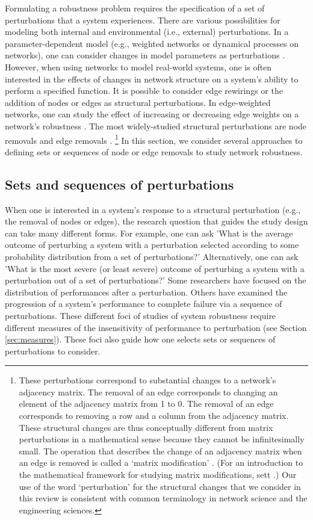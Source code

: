 \documentclass{comnet-mod}
\begin{document}
Formulating a robustness problem requires the specification of a set of perturbations that a system experiences. There are various possibilities for modeling both internal and environmental (i.e., external) perturbations. In a parameter-dependent model (e.g., weighted networks or dynamical processes on networks), one can consider changes in model parameters as perturbations \cite{Stelling2004, Walsh2013}. However, when using networks to model real-world systems, one is often interested in the effects of changes in network structure on a system's ability to perform a specified function. It is possible to consider edge rewirings \cite{Karrer2008} or the addition of nodes or edges \cite{Witthaut2012, Wang2014b} as structural perturbations. In edge-weighted networks, one can study the effect of increasing or decreasing edge weights on a network's robustness \cite{Zhang2013b}. The most widely-studied structural perturbations are node removals and edge removals \cite{Cohen2010, Gao2015}. \footnote{These perturbations correspond to substantial changes to a network's adjacency matrix. The removal of an edge corresponds to changing an element of the adjacency matrix from 1 to 0. The removal of an edge corresponds to removing a row and a column from the adjacency matrix. These structural changes are thus conceptually different from matrix perturbations in a mathematical sense because they cannot be infinitesimally small. The operation that describes the change of an adjacency matrix when an edge is removed is called a `matrix modification' \cite{Higham2003, Liu2003}. (For an introduction to the mathematical framework for studying matrix modifications, sett \cite{Higham2003}.) Our use of the word `perturbation' for the structural changes that we consider in this review is consistent with common terminology in network science and the engineering sciences.} In this section, we consider several approaches to defining sets or sequences of node or edge removals to study network robustness.


\subsection{Sets and sequences of perturbations}\label{sec:sets_and_sequences}

When one is interested in a system's response to a structural perturbation (e.g., the removal of nodes or edges), the research question that guides the study design can take many different forms. For example, one can ask 'What is the average outcome of perturbing a system with a perturbation selected according to some probability distribution from a set of perturbations?' 
Alternatively, one can ask 'What is the most severe (or least severe) outcome of perturbing a system with a perturbation out of a set of perturbations?' Some researchers have focused on the distribution of performances after a perturbation. Others have examined the progression of a system's performance to complete failure via a sequence of perturbations. These different foci of studies of system robustness require different measures of the insensitivity of performance to perturbation (see Section \ref{sec:measures}). These foci also guide how one selects sets or sequences of perturbations to consider.
\end{document}

